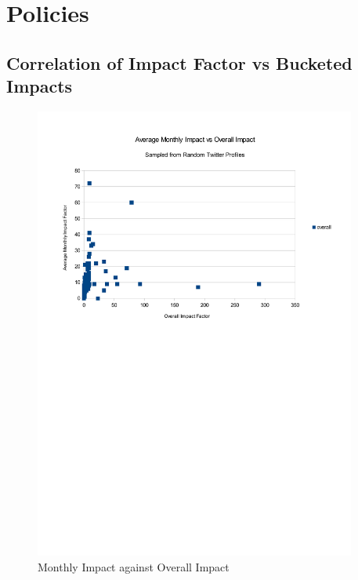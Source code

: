 \section{Policies}

\subsection{Correlation of Impact Factor vs Bucketed Impacts}

\begin{figure}[h!]
\centering
\includegraphics[width=400px]{Images/monthly_impact_vs_overallv2.pdf}
\caption{Monthly Impact against Overall Impact}
\end{figure}

